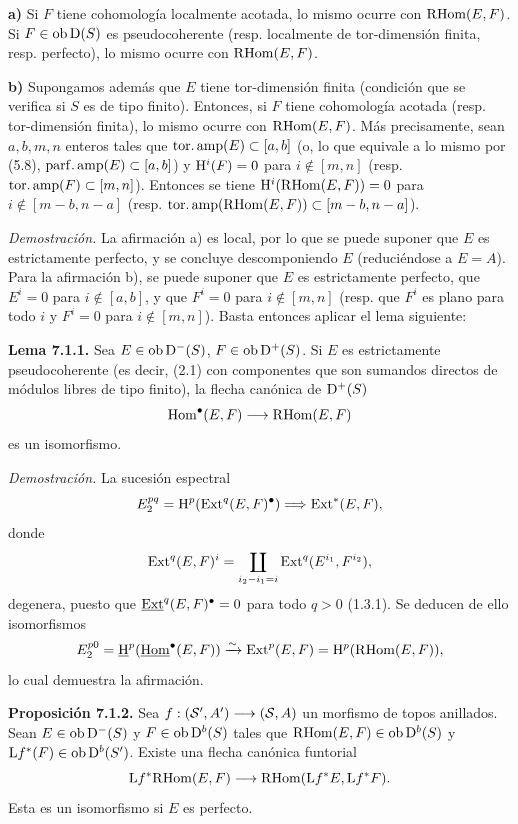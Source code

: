 \textbf{a)} Si \(F\) tiene cohomología localmente acotada, lo mismo ocurre con \(\RHom(E,F)\). Si \(F\in\Ob\Dpx(S)\) es pseudocoherente (resp. localmente de tor-dimensión finita, resp. perfecto), lo mismo ocurre con \(\RHom(E,F)\).

\textbf{b)} Supongamos además que \(E\) tiene tor-dimensión finita (condición que se verifica si \(S\) es de tipo finito). Entonces, si \(F\) tiene cohomología acotada (resp. tor-dimensión finita), lo mismo ocurre con \(\RHom(E,F)\). Más precisamente, sean \(a,b,m,n\) enteros tales que \(\tamp(E)\subset[a,b]\) (o, lo que equivale a lo mismo por (5.8), \(\pamp(E)\subset[a,b]\)) y \(\Ho^i(F)=0\) para \(i\notin[m,n]\) (resp. \(\tamp(F)\subset[m,n]\)). Entonces se tiene \(\Ho^i(\RHom(E,F))=0\) para \(i\notin[m-b,n-a]\) (resp. \(\tamp(\RHom(E,F))\subset[m-b,n-a]\)).

\emph{Demostración.} La afirmación a) es local, por lo que se puede suponer que \(E\) es estrictamente perfecto, y se concluye descomponiendo \(E\) (reduciéndose a \(E=A\)). Para la afirmación b), se puede suponer que \(E\) es estrictamente perfecto, que \(E^i=0\) para \(i\notin[a,b]\), y que \(F^i=0\) para \(i\notin[m,n]\) (resp. que \(F^i\) es plano para todo \(i\) y \(F^i=0\) para \(i\notin[m,n]\)). Basta entonces aplicar el lema siguiente:

\textbf{Lema 7.1.1.} Sea \(E\in\Ob\Dpx^-(S)\), \(F\in\Ob\Dpx^+(S)\). Si \(E\) es estrictamente pseudocoherente (es decir, (2.1) con componentes que son sumandos directos de módulos libres de tipo finito), la flecha canónica de \(\Dpx^+(S)\)
\[
  \Hom^\bullet(E,F)\longrightarrow\RHom(E,F)
\]
es un isomorfismo.

\emph{Demostración.} La sucesión espectral
\[
  E_2^{pq}=\Ho^p(\Ext^q(E,F)^\bullet)\Longrightarrow \Ext^*(E,F),
\]
donde
\[
  \Ext^q(E,F)^i=\coprod_{i_2-i_1=i}\Ext^q(E^{i_1},F^{i_2}),
\]
degenera, puesto que \(\underline{\Ext}^q(E,F)^\bullet=0\) para todo \(q>0\) (1.3.1). Se deducen de ello isomorfismos
\[
  E_2^{p0}=\underline{\Ho}^p(\underline{\Hom}^\bullet(E,F))
  \xrightarrow{\sim}\Ext^p(E,F)=\Ho^p(\RHom(E,F)),
\]
lo cual demuestra la afirmación.

\textbf{Proposición 7.1.2.} Sea \(f:(\sisi{S'}{\mathcal S'},A')\longrightarrow(\sisi{S}{\mathcal S},A)\) un morfismo de topos anillados. Sean \(E\in\Ob\Dpx^-(S)\) y \(F\in\Ob\Dpx^b(S)\) tales que \(\RHom(E,F)\in\Ob\Dpx^b(S)\) y \(\mathrm Lf^*(F)\in\Ob\Dpx^b(S')\). Existe una flecha canónica funtorial
\[
  \mathrm Lf^*\RHom(E,F)
  \longrightarrow
  \RHom(\mathrm Lf^*E,\mathrm Lf^*F).
\]
Esta es un isomorfismo si \(E\) es perfecto.

